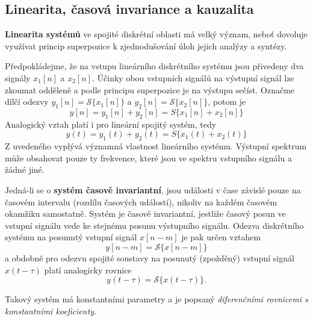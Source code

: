     \subsection{Linearita, časová invariance a kauzalita}\label{tky:IchIIsecIssecI}
      \textbf{Linearita systémů} ve spojité diskrétní oblasti má velký význam, neboť dovoluje
      využívat princip superpozice k zjednodušování úloh jejich analýzy  a syntézy.

      Předpokládejme, že na vstupu lineárního diskrétního systému jsou přivedeny dva signály
      $x_1[n]$ a $x_2[n]$. Účinky obou vstupních signálů na výstupní signál lze zkoumat odděleně a
      podle principu superpozice je na výstupu sečíst. Označme dílčí odezvy
      $y_1[n]=\mathcal{S}\{x_1[n]\}$ a $y_2[n]=\mathcal{S}\{x_2 [n]\}$, potom je
      \begin{equation}\label{tky:eq007}
        y[n]= y_1[n]+y_2[n]=S\{x_1[n]+x_2[n]\}
      \end{equation}
      Analogický vztah platí i pro lineární spojitý systém, tedy
      \begin{equation}\label{tky:eq008}
        y(t)= y_1(t)+ y_2(t)=S\{x_1(t)+x_2(t)\}
      \end{equation}
      Z uvedeného vyplývá významná vlastnost lineárního systému. Výstupní spektrum může obsahovat
      pouze ty frekvence, které jsou ve spektru vstupního signálu a žádné jiné. 

      Jedná-li se o \textbf{systém časově invariantní}, jsou události v čase závislé pouze na
      časovém intervalu (rozdílu časových událostí), nikoliv na každém časovém okamžiku samostatně.
      Systém je časově invariantní, jestliže časový posun ve vstupní signálu vede ke stejnému posunu
      výstupního signálu. Odezva diskrétního systému na posunutý vstupní signál $x[n-m]$ je pak
      určen vztahem
      \begin{equation}\label{tky:eq009}
        y[n-m]= \mathcal{S}\{x[n-m]\}
      \end{equation}
      a obdobně pro odezvu spojité soustavy na posunutý (zpožděný) vstupní signál $x(t-\tau)$ platí
      analogicky rovnice
      \begin{equation}\label{tky:eq010}
        y(t-\tau)= \mathcal{S}\{x(t-\tau)\}.
      \end{equation}

      Takový systém má konstantními parametry a je popsaný \emph{diferenčními rovnicemi s
      konstantními koeficienty}. 
      
